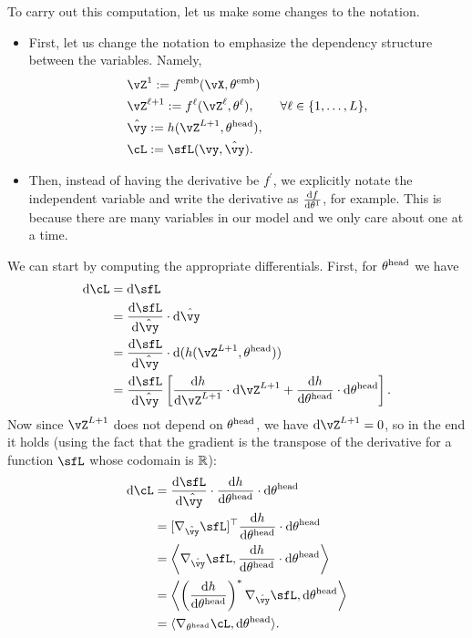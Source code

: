 \documentclass[../../book-main.tex]{subfiles}
\begin{document}
To carry out this computation, let us make some changes to the notation. 
\begin{itemize}
    \item First, let us change the notation to emphasize the dependency structure between the variables. Namely, 
    \begin{align}
        &\vZ^{1} := f^{\emb}(\vX, \theta^{\emb}) \\ 
        &\vZ^{\ell + 1} := f^{\ell}(\vZ^{\ell}, \theta^{\ell}), \qquad \forall \ell \in \{1, \dots, L\}, \\
        &\hat{\vy} := h(\vZ^{L+1}, \theta^{\head}), \\ 
        &\cL := \sfL(\vy, \hat{\vy}).
    \end{align}
    \item Then, instead of having the derivative be \(f^{\prime}\), we explicitly notate the independent variable and write the derivative as \(\odv{f}{\theta^{1}}\), for example. This is because there are many variables in our model and we only care about one at a time.
\end{itemize}
We can start by computing the appropriate differentials. First, for \(\theta^{\mathrm{head}}\) we have
\begin{align}
    \odif{\cL}
    &= \odif{\sfL} \\ 
    &= \odv{\sfL}{\hat{\vy}}\cdot\odif{\hat{\vy}} \\ 
    &= \odv{\sfL}{\hat{\vy}}\cdot\odif{{(h(\vZ^{L + 1}, \theta^{\head}))}} \\ 
    &= \odv{\sfL}{\hat{\vy}}\bs{\odv{h}{\vZ^{L + 1}}\cdot\odif{\vZ}^{L + 1} + \odv{h}{\theta^{\head}}\cdot\odif{\theta}^{\head}}.
\end{align}
Now since \(\vZ^{L + 1}\) does not depend on \(\theta^{\mathrm{head}}\), we have \(\odif{\vZ}^{L + 1} = 0\), so in the end it holds (using the fact that the gradient is the transpose of the derivative for a function \(\sfL\) whose codomain is \(\mathbb{R}\)):
\begin{align}
    \odif{\cL} 
    &= \odv{\sfL}{\hat{\vy}}\cdot\odv{h}{\theta^{\head}}\cdot\odif{\theta}^{\head} \\ 
    &= [\nabla_{\hat{\vy}}\sfL]^{\top}\odv{h}{\theta^{\head}}\cdot\odif{\theta}^{\head} \\ 
    &= \ip*{\nabla_{\hat{\vy}}\sfL}{\odv{h}{\theta^{\head}}\cdot\odif{\theta}^{\head}} \\
    &= \ip*{\bp{\odv{h}{\theta^{\head}}}^{*}\nabla_{\hat{\vy}}\sfL}{\odif{\theta}^{\head}} \\ 
    &= \ip{\nabla_{\theta^{\head}}\cL}{\odif{\theta}^{\head}}.
\end{align}
\end{document}
